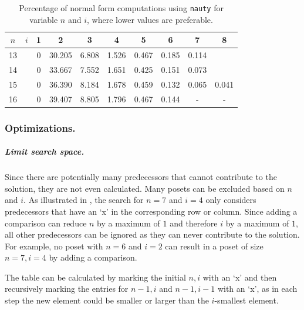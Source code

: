 \documentclass[a4paper,UKenglish,cleveref, autoref, thm-restate]{lipics-v2021}
\begin{document}
\begin{table}[!t]
  \renewcommand{\arraystretch}{1.1}
  \caption{Percentage of normal form computations using \texttt{nauty} for variable $n$ and $i$, where lower values are preferable.}
  \label{table:nauty-ratio}
  \centering
  \small
    \begin{tabular}{cr|cccccccc}
      $n$ & $i$    & 1                       & 2      & 3     & 4     & 5     & 6     & 7     & 8     \\ \hline
      13 & & 0                       & 30.205 & 6.808 & 1.526 & 0.467 & 0.185 & 0.114 &       \\
      14 & & 0                       & 33.667 & 7.552 & 1.651 & 0.425 & 0.151 & 0.073 &       \\
      15 & & 0                       & 36.390 & 8.184 & 1.678 & 0.459 & 0.132 & 0.065 & 0.041 \\
      16 & & 0                       & 39.407 & 8.805 & 1.796 & 0.467 & 0.144 & -     & -     \\
    \end{tabular}%
\end{table}

\subsubsection{Optimizations.}

\subparagraph{Limit search space.}
Since there are potentially many predecessors that cannot contribute to the solution, they are not even calculated.
Many posets can be excluded based on $n$ and $i$.
As illustrated in , the search for $n = 7$ and $i = 4$ only considers predecessors that have an `x' in the corresponding row or column.
Since adding a comparison can reduce $n$ by a maximum of $1$ and therefore $i$ by a maximum of $1$, all other predecessors can be ignored as they can never contribute to the solution.
For example, no poset with $n = 6$ and $i = 2$ can result in a poset of size $n = 7, i = 4$ by adding a comparison.

The table can be calculated by marking the initial $n, i$ with an `x' and then recursively marking the entries for $n - 1, i$ and $n - 1, i - 1$ with an `x', as in each step the new element could be smaller or larger than the $i$-smallest element.
\end{document}
